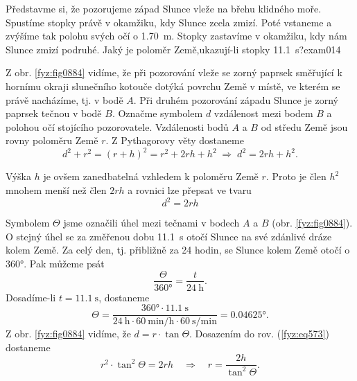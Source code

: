 \begin{fyzexam}{Představme si, že pozorujeme západ Slunce vleže na břehu klidného moře. Spustíme
  stopky právě v okamžiku, kdy Slunce zcela zmizí. Poté vstaneme a zvýšíme tak polohu svých očí o
  \qty{1.70}{\m}. Stopky zastavíme v okamžiku, kdy nám Slunce zmizí podruhé. Jaký je
  poloměr Země,ukazují-li stopky \qty{11.1}{\s}?}{exam014}

  {\centering
   \captionsetup{type=figure}
   \label{fyz:fig0885}
   \par
  }

  Z obr. \ref{fyz:fig0884} vidíme, že při pozorování vleže se zorný paprsek směřující k hornímu
  okraji slunečního kotouče dotýká povrchu Země v místě, ve kterém se právě nacházíme, tj. v bodě
  \(A\). Při druhém pozorování západu Slunce je zorný paprsek tečnou v bodě \(B\). Označme symbolem
  \(d\) vzdálenost mezi bodem \(B\) a polohou očí stojícího pozorovatele. Vzdálenosti bodů \(A\) a
  \(B\) od středu Země jsou rovny poloměru Země \(r\). Z Pythagorovy věty dostaneme
  \begin{equation*}
    d^2 + r^2 = (r + h)^2 = r^2 + 2rh + h^2\;\Rightarrow\; d^2 = 2rh + h^2.
  \end{equation*}

  Výška \(h\) je ovšem zanedbatelná vzhledem k poloměru Země \(r\). Proto je člen \(h^2\) mnohem
  menší než člen \(2rh\) a rovnici lze přepsat ve tvaru
  \begin{equation}\label{fyz:eq573}
    d^2 = 2rh
  \end{equation}

  Symbolem \(\varTheta\) jsme označili úhel mezi tečnami v bodech \(A\) a \(B\) (obr.
  \ref{fyz:fig0884}). O stejný úhel se za změřenou dobu \qty{11.1}{\s} otočí Slunce na své zdánlivé
  dráze kolem Země. Za celý den, tj. přibližně za \num{24} hodin, se Slunce kolem Země otočí o
  \ang{360}. Pak můžeme psát
  \begin{equation*}
    \dfrac{\varTheta}{\ang{360}} = \dfrac{t}{\qty{24}{\hour}}.
  \end{equation*}
  Dosadíme-li \(t = \qty{11.1}{\s}\), dostaneme
  \begin{equation*}
    \varTheta = \dfrac{\ang{360}\cdot\qty{11.1}{\s}}
                      {\qty{24}{\hour}\cdot\qty{60}{\minute\per\hour}\cdot\qty{60}{\s\per\minute}}
              =\ang{0.04625}.
  \end{equation*}
  Z obr. \ref{fyz:fig0884} vidíme, že \(d = r\cdot\tan{\varTheta}\). Dosazením do rov.
  (\ref{fyz:eq573}) dostaneme
  \begin{equation}\label{fyz:eq574}
    r^2\cdot\tan^2{\varTheta} = 2rh\quad\Rightarrow\quad 
    r = \dfrac{2h}{\tan^2{\varTheta}}.
  \end{equation}


\end{fyzexam}
